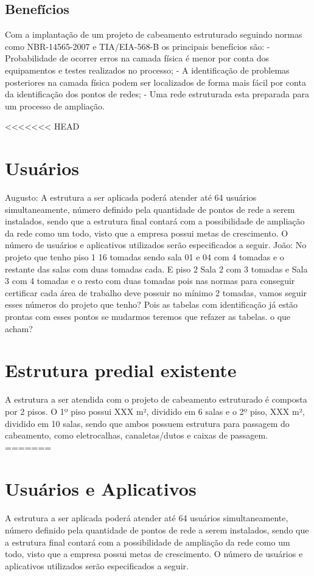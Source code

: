 \documentclass[	DIV=calc,%
							paper=a4,%
							fontsize=12pt,%
							onecolumn]{scrartcl}	 					%
\begin{document}
\subsection{Benefícios}
Com a implantação de um projeto de cabeamento estruturado seguindo normas como NBR-14565-2007 e TIA/EIA-568-B os principais benefícios são:
- Probabilidade de ocorrer erros na camada física é menor por conta dos equipamentos e testes realizados no processo;
- A identificação de problemas posteriores na camada física podem ser localizados de forma mais fácil por conta da identificação dos pontos de redes;
- Uma rede estruturada esta preparada para um processo de ampliação. 


<<<<<<< HEAD
\section{Usuários}
Augusto: A estrutura a ser aplicada poderá atender até 64 usuários simultaneamente, número definido pela quantidade de pontos de rede a serem instalados, sendo que a estrutura final contará com a possibilidade de ampliação da rede como um todo, visto que a empresa possui metas de crescimento. O número de usuários e aplicativos utilizados serão especificados a seguir.
João: No projeto que tenho piso 1 16 tomadas sendo sala 01 e 04 com 4 tomadas e o restante das salas com duas tomadas cada.
E piso 2 Sala 2 com 3 tomadas e Sala 3 com 4 tomadas e o resto com duas tomadas pois nas normas para conseguir certificar cada área de trabalho deve possuir no mínimo 2 tomadas, vamos seguir esses números do projeto que tenho? Pois as tabelas com identificação já estão prontas com esses pontos se mudarmos teremos que refazer as tabelas. o que acham?


\section{Estrutura predial existente}
A estrutura a ser atendida com o projeto de cabeamento estruturado é composta por 2 pisos. O 1º piso possui XXX m², dividido em 6 salas e o 2º piso, XXX m², dividido em 10 salas, sendo que ambos possuem estrutura para passagem do cabeamento, como eletrocalhas, canaletas/dutos e caixas de passagem.    
=======
\section{Usuários e Aplicativos}

A estrutura a ser aplicada poderá atender até 64 usuários simultaneamente, número definido pela quantidade de pontos de rede a serem instalados, sendo que a estrutura final contará com a possibilidade de ampliação da rede como um todo, visto que a empresa possui metas de crescimento. O número de usuários e aplicativos utilizados serão especificados a seguir.
\end{document}
